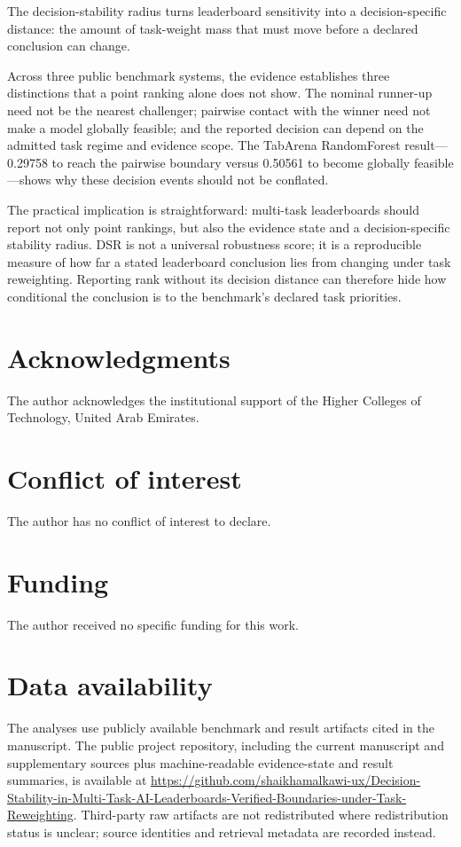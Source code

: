 \documentclass[11pt]{article}
\begin{document}
The decision-stability radius turns leaderboard sensitivity into a decision-specific distance: the amount of task-weight mass that must move before a declared conclusion can change.

Across three public benchmark systems, the evidence establishes three distinctions that a point ranking alone does not show. The nominal runner-up need not be the nearest challenger; pairwise contact with the winner need not make a model globally feasible; and the reported decision can depend on the admitted task regime and evidence scope. The TabArena RandomForest result—0.29758 to reach the pairwise boundary versus 0.50561 to become globally feasible—shows why these decision events should not be conflated.

The practical implication is straightforward: multi-task leaderboards should report not only point rankings, but also the evidence state and a decision-specific stability radius. DSR is not a universal robustness score; it is a reproducible measure of how far a stated leaderboard conclusion lies from changing under task reweighting. Reporting rank without its decision distance can therefore hide how conditional the conclusion is to the benchmark’s declared task priorities.

\section*{Acknowledgments}

The author acknowledges the institutional support of the Higher Colleges of Technology, United Arab Emirates.

\section*{Conflict of interest}

The author has no conflict of interest to declare.

\section*{Funding}

The author received no specific funding for this work.

\section*{Data availability}

The analyses use publicly available benchmark and result artifacts cited in the manuscript. The public project repository, including the current manuscript and supplementary sources plus machine-readable evidence-state and result summaries, is available at \url{https://github.com/shaikhamalkawi-ux/Decision-Stability-in-Multi-Task-AI-Leaderboards-Verified-Boundaries-under-Task-Reweighting}. Third-party raw artifacts are not redistributed where redistribution status is unclear; source identities and retrieval metadata are recorded instead.
\end{document}
